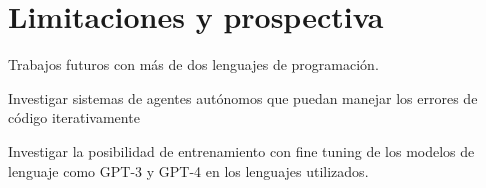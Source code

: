 \chapter{Limitaciones y prospectiva}


Trabajos futuros con más de dos lenguajes de programación.

Investigar sistemas de agentes autónomos que puedan manejar los errores de código iterativamente

Investigar la posibilidad de entrenamiento con fine tuning de los modelos de lenguaje como GPT-3 y GPT-4 en los lenguajes utilizados.

